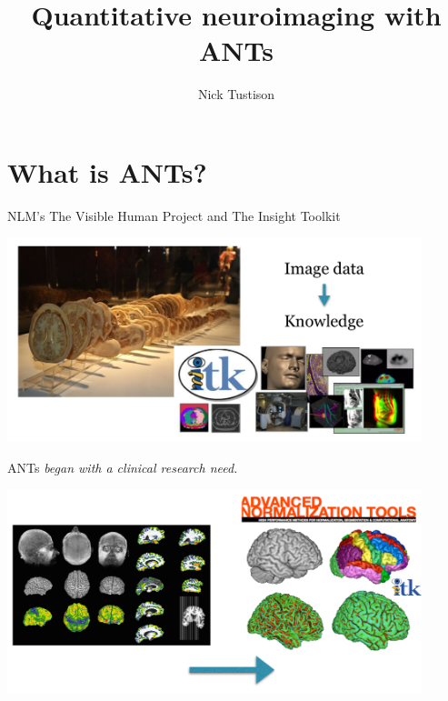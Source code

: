 \documentclass[ignorenonframetext,]{beamer}
\institute{University of Virginia}
\title{Quantitative neuroimaging with ANTs}
\author{Nick Tustison}
\date{}
\begin{document}
\frame{\titlepage}

\begin{frame}

\end{frame}

\section{What is ANTs?}\label{what-is-ants}

\begin{frame}{NLM's The Visible Human Project and The Insight Toolkit}

\begin{center}

\includegraphics[width=4.75in]{./figures/VisibleHumanProject_ITK.pdf}

\end{center}

\end{frame}

\begin{frame}{ANTs \emph{began with a clinical research need.}}

\begin{center}

\includegraphics[width=4.75in]{./figures/ANTsEvolutionarySummary.pdf}

\end{center}

\end{frame}
\end{document}
